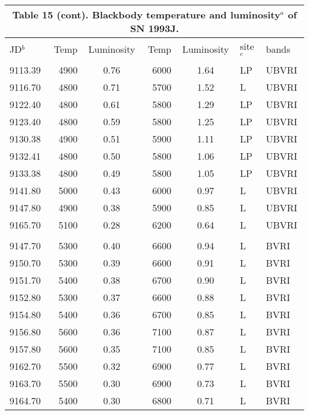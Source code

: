 \begin{center}
\begin{tabular} {l r c r c l l}
\multicolumn{7}{c}{Table 15 (cont). Blackbody temperature and luminosity$^a$ of SN 1993J.} \\ \hline\hline
JD$^b$ & \hfil Temp \hfil  & \hfil Luminosity\hfil   & \hfil Temp \hfil  & \hfil Luminosity \hfil & \hfil  site$^c$ \hfil  & \hfil  bands \hfil \\ \hline
 9113.39  &  4900  &  0.76   &     6000  &  1.64 & LP  &  UBVRI \\
 9116.70  &  4800  &  0.71   &     5700  &  1.52 & L &  UBVRI \\
 9122.40  &  4800  &  0.61   &     5800  &  1.29 & LP  &  UBVRI \\
 9123.40  &  4800  &  0.59   &     5800  &  1.25 & LP  &  UBVRI \\
 9130.38  &  4900  &  0.51   &     5900  &  1.11 & LP  &  UBVRI \\
 9132.41  &  4800  &  0.50   &     5800  &  1.06 & LP  &  UBVRI \\
 9133.38  &  4800  &  0.49   &     5800  &  1.05 & LP  &  UBVRI \\
 9141.80  &  5000  &  0.43   &     6000  &  0.97 & L &  UBVRI \\
 9147.80  &  4900  &  0.38   &     5900  &  0.85 & L &  UBVRI \\
 9165.70  &  5100  &  0.28   &     6200  &  0.64 & L &  UBVRI \\
  \\
 9147.70  &  5300  &  0.40   &     6600  &  0.94 & L &  BVRI \\
 9150.70  &  5300  &  0.39   &     6600  &  0.91 & L &  BVRI \\
 9151.70  &  5400  &  0.38   &     6700  &  0.90 & L &  BVRI \\
 9152.80  &  5300  &  0.37   &     6600  &  0.88 & L &  BVRI \\
 9154.80  &  5400  &  0.36   &     6700  &  0.85 & L &  BVRI \\
 9156.80  &  5600  &  0.36   &     7100  &  0.87 & L &  BVRI \\
 9157.80  &  5600  &  0.35   &     7100  &  0.85 & L &  BVRI \\
 9162.70  &  5500  &  0.32   &     6900  &  0.77 & L &  BVRI \\
 9163.70  &  5500  &  0.30   &     6900  &  0.73 & L &  BVRI \\
 9164.70  &  5400  &  0.30   &     6800  &  0.71 & L &  BVRI \\

\end{tabular}
\end{center}
